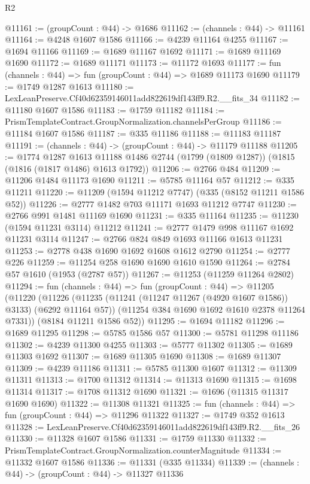 \begin{lexlean}{R2}
\begin{coremodule}
@11161 := (groupCount : @44) -> @1686
@11162 := (channels : @44) -> @11161
@11164 := @4248 @1607 @1586
@11166 := @4239 @11164 @4255
@11167 := @1694 @11166
@11169 := @1689 @11167 @1692
@11171 := @1689 @11169 @1690
@11172 := @1689 @11171
@11173 := @11172 @1693
@11177 := fun (channels : @44) => fun (groupCount : @44) => @1689 @11173 @1690
@11179 := @1749 @1287 @1613
@11180 := LexLeanPreserve.Cf40d62359146011add822619df143ff9.R2.__fits_34
@11182 := @11180 @1607 @1586
@11183 := @1759 @11182
@11184 := PrismTemplateContract.GroupNormalization.channelsPerGroup
@11186 := @11184 @1607 @1586
@11187 := @335 @11186
@11188 := @11183 @11187
@11191 := (channels : @44) -> (groupCount : @44) -> @11179 @11188
@11205 := @1774
    @1287
    @1613
    @11188
    @1486
    @2744
    (@1799 (@1809 @1287))
    (@1815 (@1816 (@1817 @1486) @1613 @1792))
@11206 := @2766 @484
@11209 := @11206 @1484 @11173 @1690
@11211 := @5785 @11164 @57
@11212 := @335 @11211
@11220 := @11209 (@1594 @11212 @7747) (@335 (@8152 @11211 @1586 @52))
@11226 := @2777 @1482 @703 @11171 @1693 @11212 @7747
@11230 := @2766 @991 @1481 @11169 @1690
@11231 := @335 @11164
@11235 := @11230 (@1594 @11231 @3114) @11212
@11241 := @2777 @1479 @998 @11167 @1692 @11231 @3114
@11247 := @2766 @824 @849 @1693 @11166 @1613 @11231
@11253 := @2778 @438 @1690 @1692 @1608 @1612 @2790
@11254 := @2777 @226
@11259 := @11254 @258 @1690 @1690 @1610 @1590
@11264 := @2784 @57 @1610 (@1953 (@2787 @57))
@11267 := @11253 (@11259 @11264 @2802)
@11294 := fun (channels : @44) =>
  fun (groupCount : @44) =>
  @11205
    (@11220
      (@11226
        (@11235 (@11241 (@11247 @11267 (@4920 @1607 @1586)) @3133) (@6292 @11164 @57))
        (@11254 @384 @1690 @1692 @1610 @2378 @11264 @7331))
      (@8184 @11211 @1586 @52))
@11295 := @1694 @11182
@11296 := @1689 @11295
@11298 := @5785 @1586 @57
@11300 := @5781 @11298 @11186
@11302 := @4239 @11300 @4255
@11303 := @5777 @11302
@11305 := @1689 @11303 @1692
@11307 := @1689 @11305 @1690
@11308 := @1689 @11307
@11309 := @4239 @11186
@11311 := @5785 @11300 @1607
@11312 := @11309 @11311
@11313 := @1700 @11312
@11314 := @11313 @1690
@11315 := @1698 @11314
@11317 := @1708 @11312 @1690
@11321 := @1696 (@11315 @11317 @1690 @1690)
@11322 := @11308 @11321
@11325 := fun (channels : @44) => fun (groupCount : @44) => @11296 @11322
@11327 := @1749 @352 @1613
@11328 := LexLeanPreserve.Cf40d62359146011add822619df143ff9.R2.__fits_26
@11330 := @11328 @1607 @1586
@11331 := @1759 @11330
@11332 := PrismTemplateContract.GroupNormalization.counterMagnitude
@11334 := @11332 @1607 @1586
@11336 := @11331 (@335 @11334)
@11339 := (channels : @44) -> (groupCount : @44) -> @11327 @11336

\end{coremodule}
\end{lexlean}

